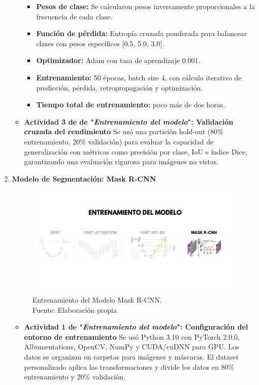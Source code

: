 \begin{enumerate}
\begin{itemize}
\begin{itemize}
\item \textbf{Pesos de clase:} Se calcularon pesos inversamente proporcionales a la frecuencia de cada clase.

\item \textbf{Función de pérdida:} Entropía cruzada ponderada para balancear clases con pesos específicos [0.5, 5.0, 3.0].

\item \textbf{Optimizador:} Adam con tasa de aprendizaje 0.001.

\item \textbf{Entrenamiento:} 50 épocas, batch size 4, con cálculo iterativo de predicción, pérdida, retropropagación y optimización.

\item \textbf{Tiempo total de entrenamiento:} poco más de dos horas.

  \end{itemize}
  

  \item\textbf{Actividad 3 de de "\textit{Entrenamiento del modelo}": Validación cruzada del rendimiento}
  Se usó una partición hold-out (80\% entrenamiento, 20\% validación) para evaluar la capacidad de generalización con métricas como precisión por clase, IoU e índice Dice, garantizando una evaluación rigurosa para imágenes no vistas.

  \end{itemize}
\newpage
\item \textbf{Modelo de Segmentación: Mask R-CNN}
\begin{figure}[H]
	\begin{center}
		\includegraphics[width=1\textwidth]{4/figures/entrmask.png}
		\caption[Entrenamiento del Modelo Mask R-CNN]{Entrenamiento del Modelo Mask R-CNN.\\
		Fuente: Elaboración propia}
		\label{4:figentmask}
	\end{center}
\end{figure}
  \begin{itemize}
    \item \textbf{Actividad 1 de "\textit{Entrenamiento del modelo}": Configuración del entorno de entrenamiento}
   Se usó Python 3.10 con PyTorch 2.0.0, Albumentations, OpenCV, NumPy y CUDA/cuDNN para GPU. Los datos se organizan en carpetas para imágenes y máscaras. El dataset personalizado aplica las transformaciones y divide los datos en 80\% entrenamiento y 20\% validación.



\end{itemize}
\end{enumerate}
